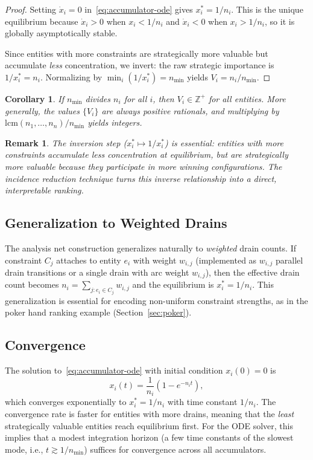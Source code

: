 \documentclass[11pt,a4paper]{article}
\newtheorem{corollary}[theorem]{Corollary}
\newtheorem{remark}[theorem]{Remark}
\newcommand{\Z}{\mathbb{Z}}
\begin{document}
\begin{proof}
Setting $\dot{x}_i = 0$ in~\eqref{eq:accumulator-ode} gives $x_i^* = 1/n_i$.
This is the unique equilibrium because $\dot{x}_i > 0$ when $x_i < 1/n_i$ and $\dot{x}_i < 0$ when $x_i > 1/n_i$, so it is globally asymptotically stable.

Since entities with more constraints are strategically more valuable but accumulate \emph{less} concentration, we invert: the raw strategic importance is $1/x_i^* = n_i$.
Normalizing by $\min_i(1/x_i^*) = n_{\min}$ yields $V_i = n_i / n_{\min}$.
\end{proof}

\begin{corollary}\label{cor:integer}
If $n_{\min}$ divides $n_i$ for all $i$, then $V_i \in \Z^+$ for all entities.
More generally, the values $\{V_i\}$ are always positive rationals, and multiplying by $\mathrm{lcm}(n_1, \ldots, n_n) / n_{\min}$ yields integers.
\end{corollary}

\begin{remark}
The inversion step ($x_i^* \mapsto 1/x_i^*$) is essential: entities with \emph{more} constraints accumulate \emph{less} concentration at equilibrium, but are strategically \emph{more} valuable because they participate in more winning configurations.
The incidence reduction technique turns this inverse relationship into a direct, interpretable ranking.
\end{remark}

\subsection{Generalization to Weighted Drains}

The analysis net construction generalizes naturally to \emph{weighted} drain counts.
If constraint $C_j$ attaches to entity $e_i$ with weight $w_{i,j}$ (implemented as $w_{i,j}$ parallel drain transitions or a single drain with arc weight $w_{i,j}$), then the effective drain count becomes $n_i = \sum_{j : e_i \in C_j} w_{i,j}$ and the equilibrium is $x_i^* = 1/n_i$.
This generalization is essential for encoding non-uniform constraint strengths, as in the poker hand ranking example (Section~\ref{sec:poker}).

\subsection{Convergence}

The solution to~\eqref{eq:accumulator-ode} with initial condition $x_i(0) = 0$ is
\begin{equation}\label{eq:convergence}
  x_i(t) = \frac{1}{n_i}\left(1 - e^{-n_i t}\right),
\end{equation}
which converges exponentially to $x_i^* = 1/n_i$ with time constant $1/n_i$.
The convergence rate is faster for entities with more drains, meaning that the \emph{least} strategically valuable entities reach equilibrium first.
For the ODE solver, this implies that a modest integration horizon (a few time constants of the slowest mode, i.e., $t \gtrsim 1/n_{\min}$) suffices for convergence across all accumulators.
\end{document}
